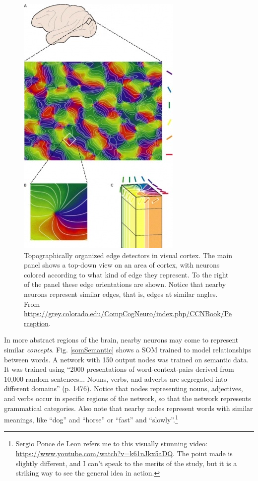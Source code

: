 \begin{figure}[h]
\centering
\includegraphics[scale=.6]{./images/edgeDetectorsCortex.jpg}
\caption[From \url{https://grey.colorado.edu/CompCogNeuro/index.php/File:fig_v1_orientation_cols_data.jpg}.]{Topographically organized edge detectors in visual cortex. The main panel shows a top-down view on an area of cortex, with neurons colored according to what kind of edge they represent. To the right of the panel these edge orientations are shown. Notice that nearby neurons represent similar edges, that is, edges at similar angles. From  \url{https://grey.colorado.edu/CompCogNeuro/index.php/CCNBook/Perception}.}
\label{edgeDetectors}
\end{figure}

In more abstract regions of the brain, nearby neurons may come to represent similar \emph{concepts}. Fig. \ref{somSemantic} shows a SOM trained to model relationships between words. A network with 150 output nodes was trained on semantic data. It was trained using ``2000 presentations of word-context-pairs derived from 10,000 random sentences... Nouns, verbs, and adverbs are segregated into different domains'' (p. 1476)\cite{kohonen1990self}. Notice that nodes representing nouns, adjectives, and verbs occur in specific regions of the network, so that the network represents grammatical categories. Also note that nearby nodes represent words with similar meanings, like ``dog'' and ``horse'' or ``fast'' and ``slowly''.\footnote{Sergio Ponce de Leon refers me to this visually stunning video: \url{https://www.youtube.com/watch?v=k61nJkx5aDQ}. The point made is slightly different, and I can't speak to the merits of the study, but it is a striking way to see the general idea in action.}


